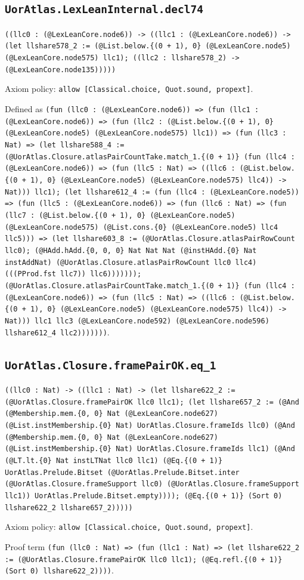 \documentclass[11pt]{article}
\begin{document}
\subsection*{\texttt{UorAtlas.LexLeanInternal.decl74}}
\noindent\texttt{((llc0 : (@LexLeanCore.node6)) -> ((llc1 : (@LexLeanCore.node6)) -> (let llshare578\_2 := (@List.below.\{(0 + 1), 0\} (@LexLeanCore.node5) (@LexLeanCore.node575) llc1); ((llc2 : llshare578\_2) -> (@LexLeanCore.node135)))))}\par
\noindent Axiom policy: \texttt{allow [Classical.choice, Quot.sound, propext]}.\par
\noindent Defined as \texttt{(fun (llc0 : (@LexLeanCore.node6)) => (fun (llc1 : (@LexLeanCore.node6)) => (fun (llc2 : (@List.below.\{(0 + 1), 0\} (@LexLeanCore.node5) (@LexLeanCore.node575) llc1)) => (fun (llc3 : Nat) => (let llshare588\_4 := (@UorAtlas.Closure.atlasPairCountTake.match\_1.\{(0 + 1)\} (fun (llc4 : (@LexLeanCore.node6)) => (fun (llc5 : Nat) => ((llc6 : (@List.below.\{(0 + 1), 0\} (@LexLeanCore.node5) (@LexLeanCore.node575) llc4)) -> Nat))) llc1); (let llshare612\_4 := (fun (llc4 : (@LexLeanCore.node5)) => (fun (llc5 : (@LexLeanCore.node6)) => (fun (llc6 : Nat) => (fun (llc7 : (@List.below.\{(0 + 1), 0\} (@LexLeanCore.node5) (@LexLeanCore.node575) (@List.cons.\{0\} (@LexLeanCore.node5) llc4 llc5))) => (let llshare603\_8 := (@UorAtlas.Closure.atlasPairRowCount llc0); (@HAdd.hAdd.\{0, 0, 0\} Nat Nat Nat (@instHAdd.\{0\} Nat instAddNat) (@UorAtlas.Closure.atlasPairRowCount llc0 llc4) (((PProd.fst llc7)) llc6))))))); (@UorAtlas.Closure.atlasPairCountTake.match\_1.\{(0 + 1)\} (fun (llc4 : (@LexLeanCore.node6)) => (fun (llc5 : Nat) => ((llc6 : (@List.below.\{(0 + 1), 0\} (@LexLeanCore.node5) (@LexLeanCore.node575) llc4)) -> Nat))) llc1 llc3 (@LexLeanCore.node592) (@LexLeanCore.node596) llshare612\_4 llc2)))))))}.\par
\subsection*{\texttt{UorAtlas.Closure.framePairOK.eq\_1}}
\noindent\texttt{((llc0 : Nat) -> ((llc1 : Nat) -> (let llshare622\_2 := (@UorAtlas.Closure.framePairOK llc0 llc1); (let llshare657\_2 := (@And (@Membership.mem.\{0, 0\} Nat (@LexLeanCore.node627) (@List.instMembership.\{0\} Nat) UorAtlas.Closure.frameIds llc0) (@And (@Membership.mem.\{0, 0\} Nat (@LexLeanCore.node627) (@List.instMembership.\{0\} Nat) UorAtlas.Closure.frameIds llc1) (@And (@LT.lt.\{0\} Nat instLTNat llc0 llc1) (@Eq.\{(0 + 1)\} UorAtlas.Prelude.Bitset (@UorAtlas.Prelude.Bitset.inter (@UorAtlas.Closure.frameSupport llc0) (@UorAtlas.Closure.frameSupport llc1)) UorAtlas.Prelude.Bitset.empty)))); (@Eq.\{(0 + 1)\} (Sort 0) llshare622\_2 llshare657\_2)))))}\par
\noindent Axiom policy: \texttt{allow [Classical.choice, Quot.sound, propext]}.\par
\noindent Proof term \texttt{(fun (llc0 : Nat) => (fun (llc1 : Nat) => (let llshare622\_2 := (@UorAtlas.Closure.framePairOK llc0 llc1); (@Eq.refl.\{(0 + 1)\} (Sort 0) llshare622\_2))))}.\par
\end{document}
